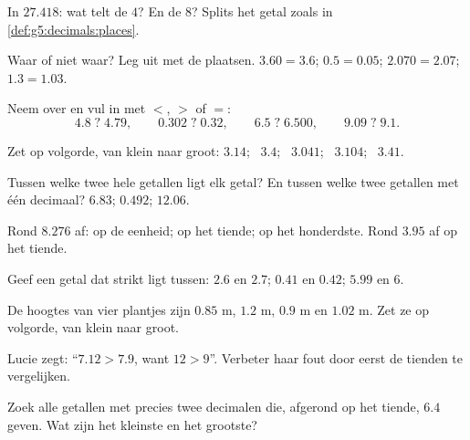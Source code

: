 \begin{exercise}[$\star$]\label{exo:g5:decimals:2}
In $27.418$: wat telt de $4$? En de $8$? Splits het getal zoals in
\cref{def:g5:decimals:places}.
\end{exercise}

\begin{exercise}[$\star$]\label{exo:g5:decimals:3}
Waar of niet waar? Leg uit met de plaatsen.
$3.60 = 3.6$; \quad $0.5 = 0.05$; \quad $2.070 = 2.07$; \quad
$1.3 = 1.03$.
\end{exercise}

\begin{exercise}[$\star$]\label{exo:g5:decimals:4}
Neem over en vul in met $<$, $>$ of $=$:
\[
4.8 \;?\; 4.79, \qquad
0.302 \;?\; 0.32, \qquad
6.5 \;?\; 6.500, \qquad
9.09 \;?\; 9.1 .
\]
\end{exercise}

\begin{exercise}[$\star$]\label{exo:g5:decimals:5}
Zet op volgorde, van klein naar groot: $3.14$; \ $3.4$; \ $3.041$; \
$3.104$; \ $3.41$.
\end{exercise}

\begin{exercise}[$\star$]\label{exo:g5:decimals:6}
Tussen welke twee hele getallen ligt elk getal? En tussen welke twee
getallen met één decimaal? \quad $6.83$; \quad $0.492$; \quad $12.06$.
\end{exercise}

\begin{exercise}[$\star$]\label{exo:g5:decimals:7}
Rond $8.276$ af: op de eenheid; op het tiende; op het honderdste. Rond
$3.95$ af op het tiende.
\end{exercise}

\begin{exercise}[$\star$]\label{exo:g5:decimals:8}
Geef een getal dat strikt ligt tussen: $2.6$ en $2.7$; \quad $0.41$ en
$0.42$; \quad $5.99$ en $6$.
\end{exercise}

\begin{exercise}[$\star$]\label{exo:g5:decimals:9}
De hoogtes van vier plantjes zijn $0.85$ m, $1.2$ m, $0.9$ m en $1.02$ m.
Zet ze op volgorde, van klein naar groot.
\end{exercise}

\begin{exercise}[$\star\star$]\label{exo:g5:decimals:10}
Lucie zegt: ``$7.12 > 7.9$, want $12 > 9$''. Verbeter haar fout door eerst
de tienden te vergelijken.
\end{exercise}

\begin{exercise}[$\star\star$]\label{exo:g5:decimals:11}
Zoek alle getallen met precies twee decimalen die, afgerond op het tiende,
$6.4$ geven. Wat zijn het kleinste en het grootste?
\end{exercise}
